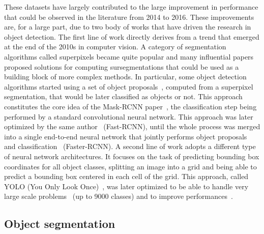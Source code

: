 These datasets have largely contributed to the large improvement in performance
that could be observed in the literature from 2014 to 2016.
These improvements are, for a large part,
due to two body of works that have driven the research in object detection.
The first line of work directly derives from a trend that emerged
at the end of the 2010s in computer vision.
A category of segmentation algorithms called superpixels became quite popular and many
influential papers~\cite{felzenszwalb2004efficient, achanta2012slic, levinshtein2009turbopixels}
proposed solutions for computing sursegmentations that could be used
as a building block of more complex methods.
In particular, some object detection algorithms started using
a set of object proposals~\cite{uijlings2013selective},
computed from a superpixel segmentation,
that would be later classified as objects or not.
This approach constitutes the core idea of the Mask-RCNN paper~\cite{girshick2014maskrcnn},
the classification step being performed by a standard convolutional neural network.
This approach was later optimized by
the same author~\cite{girshick2014fastrcnn} (Fast-RCNN),
until the whole process was merged into a single end-to-end neural network that jointly
performs object proposals and classification~\cite{ren2015faster} (Faster-RCNN).
A second line of work adopts a different type of neural network architectures.
It focuses on the task of predicting bounding box coordinates for all object classes,
splitting an image into a grid and being able
to predict a bounding box centered in each cell of the grid.
This approach, called YOLO (You Only Look Once)~\cite{redmon2016you},
was later optimized to be able to handle
very large scale problems~\cite{redmon2017yolo9000} (up to 9000 classes)
and to improve performances~\cite{redmon2018yolov3}.

\subsection{Object segmentation}

